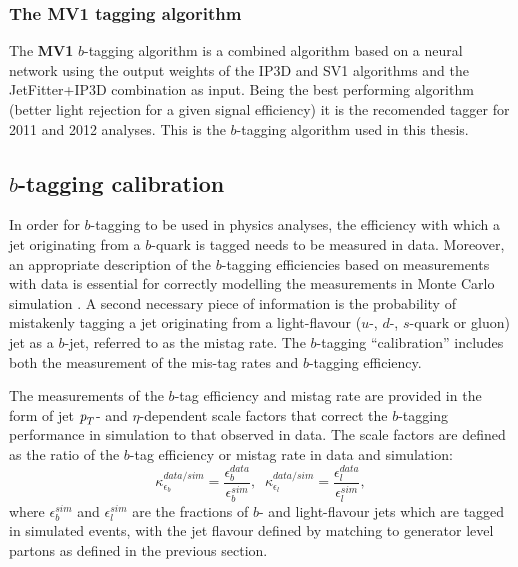 

\subsubsection{The MV1 tagging algorithm}


The \textbf{MV1} $b$-tagging algorithm is a combined algorithm based on a neural network using the output weights of the IP3D and SV1 algorithms and the JetFitter+IP3D combination as input.  Being the best performing algorithm (better light rejection for a given signal efficiency) it is the recomended tagger for 2011 and 2012 analyses. This is the $b$-tagging algorithm used in this thesis.


\subsection{$b$-tagging calibration}


In order for $b$-tagging to be used in physics analyses, the efficiency with which a jet originating from a $b$-quark is tagged needs to be measured in data.  Moreover, an appropriate description of the $b$-tagging efficiencies based on measurements with data is essential for correctly modelling the measurements in Monte Carlo simulation . A second necessary piece of information is the probability of mistakenly tagging a jet originating from a light-flavour ($u$-, $d$-, $s$-quark or gluon) jet as a $b$-jet, referred to as the mistag rate. The $b$-tagging ``calibration'' includes both the measurement of the mis-tag rates and $b$-tagging efficiency.


The measurements of the $b$-tag efficiency and mistag rate are provided in the form of jet ${\emph{p}_{T}}$- and $\eta$-dependent scale factors that correct the $b$-tagging performance in simulation to that observed in data.  The scale factors are defined as the ratio of the $b$-tag efficiency or mistag rate in data and simulation:
%
\begin{equation}
\kappa_{\epsilon_b}^{data/sim}  = \frac{\epsilon_b^{data}}{\epsilon_b^{sim}}, \; \;   \kappa_{\epsilon_l}^{data/sim}  = \frac{\epsilon_l^{data}}{\epsilon_l^{sim}},
\end{equation}
%
where $\epsilon_b^{sim}$ and $\epsilon_l^{sim}$ are the fractions of $b$- and light-flavour jets which are tagged in simulated events, %
 with the jet flavour defined by matching to generator level partons as defined in the previous section. %

